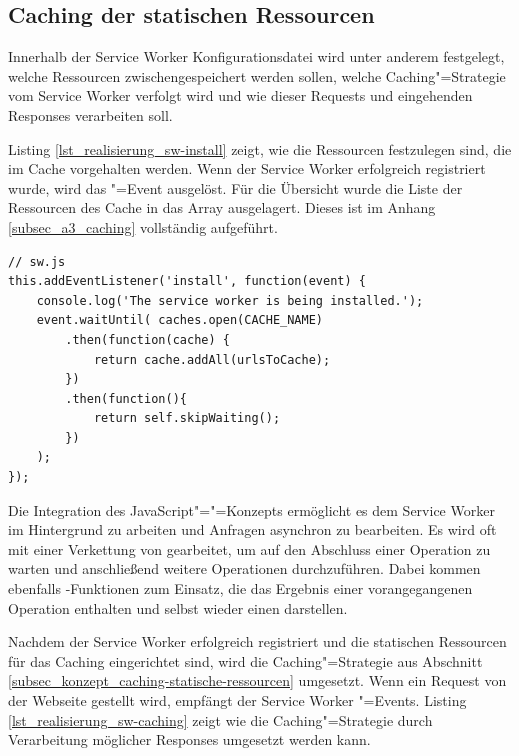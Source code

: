 \subsection{Caching der statischen Ressourcen}

Innerhalb der Service Worker Konfigurationsdatei wird unter anderem festgelegt, welche Ressourcen zwischengespeichert werden sollen, welche Caching"=Strategie vom Service Worker verfolgt wird und wie dieser Requests und eingehenden Responses verarbeiten soll. 

Listing \ref{lst_realisierung_sw-install} zeigt, wie die Ressourcen festzulegen sind, die im Cache vorgehalten werden. Wenn der Service Worker erfolgreich registriert wurde, wird das "=Event ausgelöst. Für die Übersicht wurde die Liste der Ressourcen des Cache in das Array  ausgelagert. Dieses ist im Anhang \ref{subsec_a3_caching} vollständig aufgeführt.\\

\begin{lstlisting}[caption={Ressourcen festlegen, die im Zwischenspeicher vorgehalten werden sollen},label={lst_realisierung_sw-install}, frame=single]
// sw.js
this.addEventListener('install', function(event) {
    console.log('The service worker is being installed.');
    event.waitUntil( caches.open(CACHE_NAME)
        .then(function(cache) {
            return cache.addAll(urlsToCache);
        })
        .then(function(){
            return self.skipWaiting();
        })
    );
});
\end{lstlisting}
  
Die Integration des JavaScript"="=Konzepts ermöglicht es dem Service Worker im Hintergrund zu arbeiten und Anfragen asynchron zu bearbeiten. Es wird oft mit einer Verkettung von  gearbeitet, um auf den Abschluss einer Operation zu warten und anschließend weitere Operationen durchzuführen. Dabei kommen ebenfalls -Funktionen zum Einsatz, die das Ergebnis einer vorangegangenen Operation enthalten und selbst wieder einen  darstellen.  

\newpage
Nachdem der Service Worker erfolgreich registriert und die statischen Ressourcen für das Caching eingerichtet sind, wird die Caching"=Strategie aus Abschnitt \ref{subsec_konzept_caching-statische-ressourcen} umgesetzt. Wenn ein Request von der Webseite gestellt wird, empfängt der Service Worker "=Events. Listing \ref{lst_realisierung_sw-caching} zeigt wie die Caching"=Strategie durch Verarbeitung möglicher Responses umgesetzt werden kann. \\


